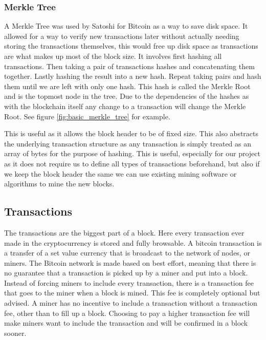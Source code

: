 \documentclass[12pt]{article}
\begin{document}
\subsubsection{Merkle Tree}\label{subsubsec:merkle_tree}

A Merkle Tree was used by Satoshi for Bitcoin as a way to save disk space. It allowed for a way to verify new transactions later without actually needing storing the transactions themselves, this would free up disk space as transactions are what makes up most of the block size. It involves first hashing all transactions. Then taking a pair of transactions hashes and concatenating them together. Lastly hashing the result into a new hash. Repeat taking pairs and hash them until we are left with only one hash. This hash is called the Merkle Root and is the topmost node in the tree. Due to the dependencies of the hashes as with the blockchain itself any change to a transaction will change the Merkle Root. See figure \ref{fig:basic_merkle_tree} for example.


This is useful as it allows the block header to be of fixed size. This also abstracts the underlying transaction structure as any transaction is simply treated as an array of bytes for the purpose of hashing. This is useful, especially for our project as it does not require us to define all types of transactions beforehand, but also if we keep the block header the same we can use existing mining software or algorithms to mine the new blocks.


\subsection{Transactions}

The transactions are the biggest part of a block. Here every transaction ever made in the cryptocurrency is stored and fully browsable. A bitcoin transaction is a transfer of a set value currency that is broadcast to the network of nodes, or miners. The Bitcoin network is made based on best effort, meaning that there is no guarantee that a transaction is picked up by a miner and put into a block. Instead of forcing miners to include every transaction, there is a transaction fee that goes to the miner when a block is mined. This fee is completely optional but advised. A miner has no incentive to include a transaction without a transaction fee, other than to fill up a block. Choosing to pay a higher transaction fee will make miners want to include the transaction and will be confirmed in a block sooner. 
\end{document}
